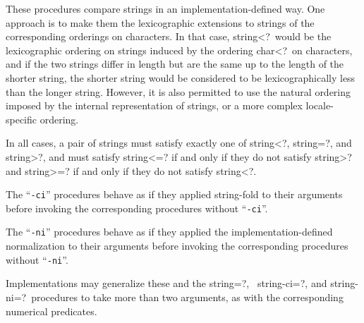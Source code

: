 \begin{entry}{%
}

These procedures compare strings in an implementation-defined way.
One approach is to make them the lexicographic extensions to strings of
the corresponding orderings on characters.  In that case, {\cf string<?}\
would be the lexicographic ordering on strings induced by the ordering
{\cf char<?}\ on characters, and if the two strings differ in length but
are the same up to the length of the shorter string, the shorter string
would be considered to be lexicographically less than the longer string.
However, it is also permitted to use the natural ordering imposed by the
internal representation of strings, or a more complex locale-specific
ordering.

In all cases, a pair of strings must satisfy exactly one of
{\cf string<?}, {\cf string=?}, and {\cf string>?}, and must satisfy
{\cf string<=?} if and only if they do not satisfy {\cf string>?} and
{\cf string>=?} if and only if they do not satisfy {\cf string<?}.

The \hbox{``{\tt -ci}''} procedures behave as if they applied
{\cf string-fold} to their arguments before invoking the corresponding
procedures without  \hbox{``{\tt -ci}''}.

The \hbox{``{\tt -ni}''} procedures behave as if they applied the
implementation-defined normalization to their arguments before
invoking the corresponding procedures without \hbox{``{\tt -ni}''}.

Implementations may generalize these and the {\cf string=?},\ {\cf
  string-ci=?}, and {\cf string-ni=?}\ procedures to take more than
two arguments, as with the corresponding numerical predicates.

\end{entry}


